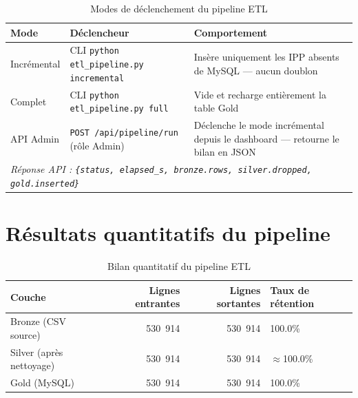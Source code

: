 \documentclass[12pt,a4paper]{report}
\begin{document}
	\begin{table}[H]
		\centering
		\caption{Modes de déclenchement du pipeline ETL}
		\renewcommand{\arraystretch}{1.3}
		\begin{tabularx}{\textwidth}{llX}
			\toprule
			\textbf{Mode} & \textbf{Déclencheur} & \textbf{Comportement} \\
			\midrule
			Incrémental & CLI \texttt{python etl\_pipeline.py incremental} &
			Insère uniquement les IPP absents de MySQL — aucun doublon \\
			Complet & CLI \texttt{python etl\_pipeline.py full} &
			Vide et recharge entièrement la table Gold \\
			API Admin & \texttt{POST /api/pipeline/run} (rôle Admin) &
			Déclenche le mode incrémental depuis le dashboard — retourne le bilan en JSON \\
			\midrule
			\multicolumn{3}{l}{\textit{Réponse API : \texttt{\{status, elapsed\_s, bronze.rows, silver.dropped, gold.inserted\}}}} \\
			\bottomrule
		\end{tabularx}
	\end{table}
	
	\section{Résultats quantitatifs du pipeline}
	
	\begin{table}[H]
		\centering
		\caption{Bilan quantitatif du pipeline ETL}
		\begin{tabular}{lrrl}
			\toprule
			\textbf{Couche} & \textbf{Lignes entrantes} & \textbf{Lignes sortantes} & \textbf{Taux de rétention} \\
			\midrule
			Bronze (CSV source)      & 530~914 & 530~914 & 100.0\% \\
			Silver (après nettoyage) & 530~914 & 530~914 & $\approx$100.0\% \\
			Gold (MySQL)             & 530~914 & 530~914 & 100.0\% \\
			\bottomrule
		\end{tabular}
	\end{table}
	
\end{document}
